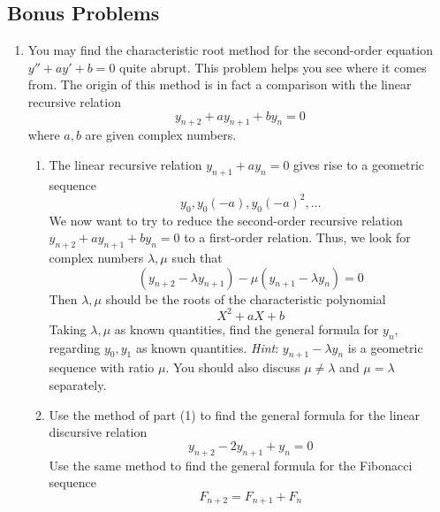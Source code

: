 \documentclass[../psets.tex]{subfiles}
\begin{document}
\subsection*{Bonus Problems}
\begin{enumerate}
    \item You may find the characteristic root method for the second-order equation $y''+ay'+b=0$ quite abrupt. This problem helps you see where it comes from. The origin of this method is in fact a comparison with the linear recursive relation
    \begin{equation*}
        y_{n+2}+ay_{n+1}+by_n = 0
    \end{equation*}
    where $a,b$ are given complex numbers.
    \begin{enumerate}
        \item The linear recursive relation $y_{n+1}+ay_n=0$ gives rise to a geometric sequence
        \begin{equation*}
            y_0,y_0(-a),y_0(-a)^2,\dots
        \end{equation*}
        We now want to try to reduce the second-order recursive relation $y_{n+2}+ay_{n+1}+by_n=0$ to a first-order relation. Thus, we look for complex numbers $\lambda,\mu$ such that
        \begin{equation*}
            (y_{n+2}-\lambda y_{n+1})-\mu(y_{n+1}-\lambda y_n) = 0
        \end{equation*}
        Then $\lambda,\mu$ should be the roots of the characteristic polynomial
        \begin{equation*}
            X^2+aX+b
        \end{equation*}
        Taking $\lambda,\mu$ as known quantities, find the general formula for $y_n$, regarding $y_0,y_1$ as known quantities. \emph{Hint}: $y_{n+1}-\lambda y_n$ is a geometric sequence with ratio $\mu$. You should also discuss $\mu\neq\lambda$ and $\mu=\lambda$ separately.
        \item Use the method of part (1) to find the general formula for the linear discursive relation
        \begin{equation*}
            y_{n+2}-2y_{n+1}+y_n = 0
        \end{equation*}
        Use the same method to find the general formula for the Fibonacci sequence
        \begin{equation*}
            F_{n+2} = F_{n+1}+F_n
        \end{equation*}
    \end{enumerate}

\end{enumerate}
\end{document}
